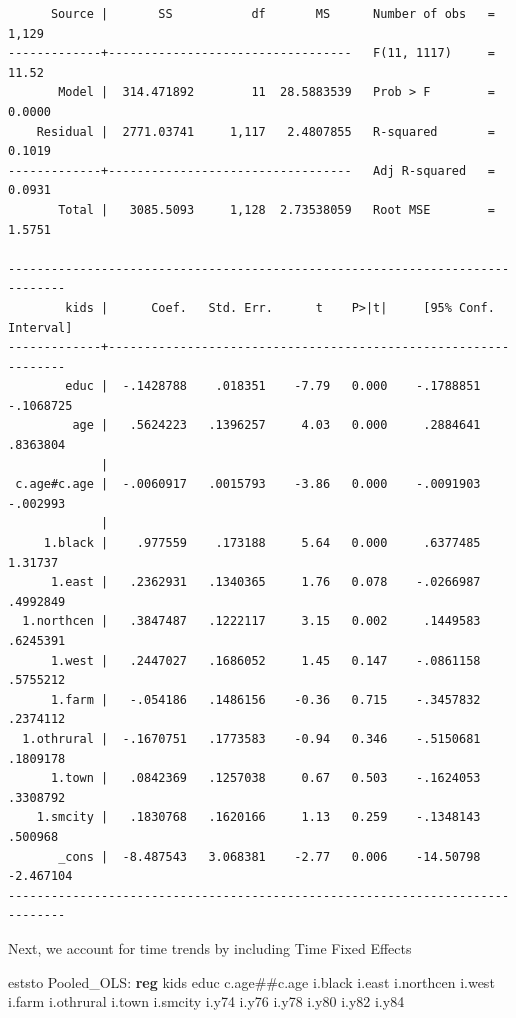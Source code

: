 \documentclass[
]{book}
\newenvironment{Shaded}{\begin{snugshade}}{\end{snugshade}}
\newcommand{\BaseNTok}[1]{\textcolor[rgb]{0.00,0.00,0.81}{#1}}
\newcommand{\KeywordTok}[1]{\textcolor[rgb]{0.13,0.29,0.53}{\textbf{#1}}}
\newcommand{\NormalTok}[1]{#1}
\begin{document}
\begin{verbatim}
      Source |       SS           df       MS      Number of obs   =     1,129
-------------+----------------------------------   F(11, 1117)     =     11.52
       Model |  314.471892        11  28.5883539   Prob > F        =    0.0000
    Residual |  2771.03741     1,117   2.4807855   R-squared       =    0.1019
-------------+----------------------------------   Adj R-squared   =    0.0931
       Total |   3085.5093     1,128  2.73538059   Root MSE        =    1.5751

------------------------------------------------------------------------------
        kids |      Coef.   Std. Err.      t    P>|t|     [95% Conf. Interval]
-------------+----------------------------------------------------------------
        educ |  -.1428788    .018351    -7.79   0.000    -.1788851   -.1068725
         age |   .5624223   .1396257     4.03   0.000     .2884641    .8363804
             |
 c.age#c.age |  -.0060917   .0015793    -3.86   0.000    -.0091903    -.002993
             |
     1.black |    .977559    .173188     5.64   0.000     .6377485     1.31737
      1.east |   .2362931   .1340365     1.76   0.078    -.0266987    .4992849
  1.northcen |   .3847487   .1222117     3.15   0.002     .1449583    .6245391
      1.west |   .2447027   .1686052     1.45   0.147    -.0861158    .5755212
      1.farm |   -.054186   .1486156    -0.36   0.715    -.3457832    .2374112
  1.othrural |  -.1670751   .1773583    -0.94   0.346    -.5150681    .1809178
      1.town |   .0842369   .1257038     0.67   0.503    -.1624053    .3308792
    1.smcity |   .1830768   .1620166     1.13   0.259    -.1348143     .500968
       _cons |  -8.487543   3.068381    -2.77   0.006    -14.50798   -2.467104
------------------------------------------------------------------------------
\end{verbatim}

Next, we account for time trends by including Time Fixed Effects

\begin{Shaded}
\begin{Highlighting}[]
\NormalTok{eststo Pooled\_OLS: }\KeywordTok{reg}\NormalTok{ kids educ c.age\#\#c.age i.}\BaseNTok{black}\NormalTok{ i.east i.northcen i.west i.farm i.othrural i.town i.smcity i.y74 i.y76 i.y78 i.y80 i.y82 i.y84}
\end{Highlighting}
\end{Shaded}
\end{document}
